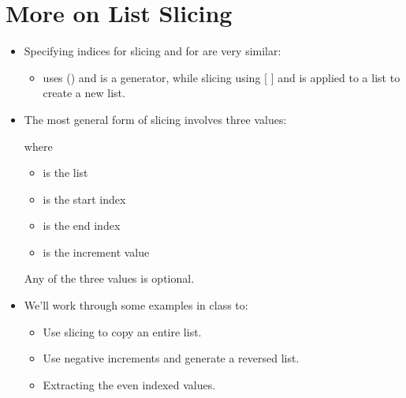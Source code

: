 \documentclass[letterpaper,10pt,english]{sphinxmanual}
\begin{document}
\section{More on List Slicing}
\label{\detokenize{lecture_notes/lec10_lists2:more-on-list-slicing}}\begin{itemize}
\item {} 
Specifying indices for slicing and for  are very
similar:
\begin{itemize}
\item {} 
 uses () and is a generator, while slicing
using {[} {]} and is applied to a list to create a new list.

\end{itemize}

\item {} 
The most general form of slicing involves three values:

\begin{sphinxVerbatim}[commandchars=\\\{\}]
\PYG{p}{[}\PYG{p}{]}
\end{sphinxVerbatim}

where
\begin{itemize}
\item {} 
 is the list

\item {} 
 is the start index

\item {} 
 is the end index

\item {} 
 is the increment value

\end{itemize}

Any of the three values is optional.

\item {} 
We’ll work through some examples in class to:
\begin{itemize}
\item {} 
Use slicing to copy an entire list.

\item {} 
Use negative increments and generate a reversed list.

\item {} 
Extracting the even indexed values.


\end{itemize}
\end{itemize}
\end{document}
